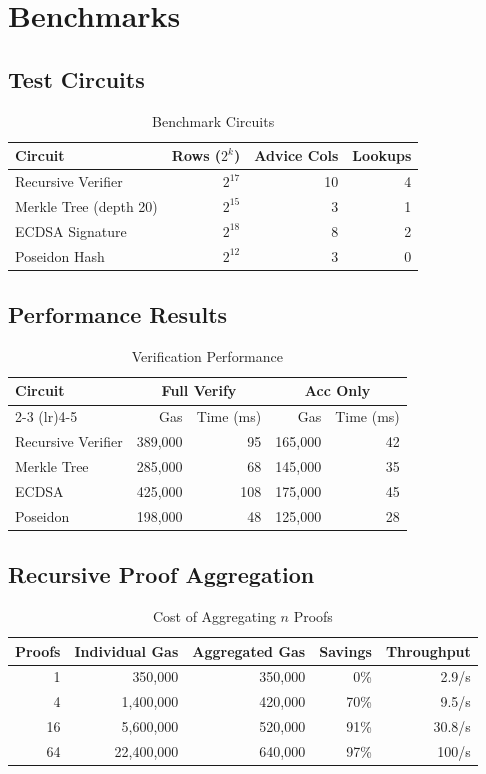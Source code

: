 \documentclass[11pt,a4paper]{article}
\theoremstyle{definition}
\begin{document}
\section{Benchmarks}

\subsection{Test Circuits}

\begin{table}[h]
\centering
\caption{Benchmark Circuits}
\begin{tabular}{lrrr}
\toprule
Circuit & Rows ($2^k$) & Advice Cols & Lookups \\
\midrule
Recursive Verifier & $2^{17}$ & 10 & 4 \\
Merkle Tree (depth 20) & $2^{15}$ & 3 & 1 \\
ECDSA Signature & $2^{18}$ & 8 & 2 \\
Poseidon Hash & $2^{12}$ & 3 & 0 \\
\bottomrule
\end{tabular}
\end{table}

\subsection{Performance Results}

\begin{table}[h]
\centering
\caption{Verification Performance}
\begin{tabular}{lrrrr}
\toprule
Circuit & \multicolumn{2}{c}{Full Verify} & \multicolumn{2}{c}{Acc Only} \\
\cmidrule(lr){2-3} \cmidrule(lr){4-5}
& Gas & Time (ms) & Gas & Time (ms) \\
\midrule
Recursive Verifier & 389,000 & 95 & 165,000 & 42 \\
Merkle Tree & 285,000 & 68 & 145,000 & 35 \\
ECDSA & 425,000 & 108 & 175,000 & 45 \\
Poseidon & 198,000 & 48 & 125,000 & 28 \\
\bottomrule
\end{tabular}
\end{table}

\subsection{Recursive Proof Aggregation}

\begin{table}[h]
\centering
\caption{Cost of Aggregating $n$ Proofs}
\begin{tabular}{rrrrr}
\toprule
Proofs & Individual Gas & Aggregated Gas & Savings & Throughput \\
\midrule
1 & 350,000 & 350,000 & 0\% & 2.9/s \\
4 & 1,400,000 & 420,000 & 70\% & 9.5/s \\
16 & 5,600,000 & 520,000 & 91\% & 30.8/s \\
64 & 22,400,000 & 640,000 & 97\% & 100/s \\
\bottomrule
\end{tabular}
\end{table}
\end{document}
